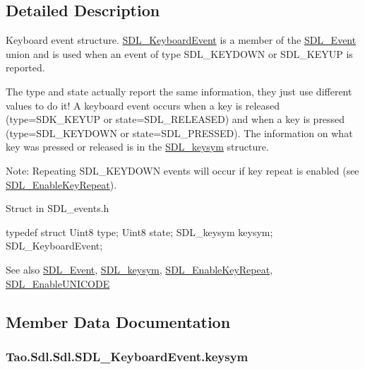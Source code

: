 \subsection{Detailed Description}
Keyboard event structure. \hyperlink{struct_tao_1_1_sdl_1_1_sdl_1_1_s_d_l___keyboard_event}{SDL\_\-KeyboardEvent} is a member of the \hyperlink{struct_tao_1_1_sdl_1_1_s_d_l___event}{SDL\_\-Event} union and is used when an event of type SDL\_\-KEYDOWN or SDL\_\-KEYUP is reported. 

The type and state actually report the same information, they just use different values to do it! A keyboard event occurs when a key is released (type=SDK\_\-KEYUP or state=SDL\_\-RELEASED) and when a key is pressed (type=SDL\_\-KEYDOWN or state=SDL\_\-PRESSED). The information on what key was pressed or released is in the \hyperlink{struct_tao_1_1_sdl_1_1_s_d_l__keysym}{SDL\_\-keysym} structure. 

Note: Repeating SDL\_\-KEYDOWN events will occur if key repeat is enabled (see \hyperlink{_sdl_8cs_af31ec1fa8ac9f58ec682d0ae0b363cc8}{SDL\_\-EnableKeyRepeat}). 

Struct in SDL\_\-events.h 
\begin{DoxyCode}
            typedef struct{
                        Uint8 type;
                        Uint8 state;
                        SDL_keysym keysym;
                } SDL_KeyboardEvent;
\end{DoxyCode}


\begin{DoxySeeAlso}{See also}
\hyperlink{struct_tao_1_1_sdl_1_1_s_d_l___event}{SDL\_\-Event}, \hyperlink{struct_tao_1_1_sdl_1_1_s_d_l__keysym}{SDL\_\-keysym}, \hyperlink{_sdl_8cs_af31ec1fa8ac9f58ec682d0ae0b363cc8}{SDL\_\-EnableKeyRepeat}, \hyperlink{_sdl_8cs_a84ff6db83e36f31aa5b5643cc18b1364}{SDL\_\-EnableUNICODE}


\end{DoxySeeAlso}


\subsection{Member Data Documentation}
\hypertarget{struct_tao_1_1_sdl_1_1_sdl_1_1_s_d_l___keyboard_event_ad6998ba475cab7e1e3743fc5a988e650}{
\subsubsection[{keysym}]{ {\bf Tao.Sdl.Sdl.SDL\_\-KeyboardEvent.keysym}}}
\label{struct_tao_1_1_sdl_1_1_sdl_1_1_s_d_l___keyboard_event_ad6998ba475cab7e1e3743fc5a988e650}



